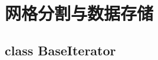 \documentclass[cn, bibend=bibtex]{elegantpaper}
\theoremstyle{plain}
\begin{document}
\begin{itemize}
\begin{enumerate}
    \end{enumerate}
\end{itemize}
\section{网格分割与数据存储}


\subsection{class BaseIterator}
\end{document}
